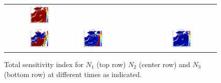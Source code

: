\begin{figure}[h]
\begin{tabular}{clc}
\hspace*{-65pt}
\includegraphics[width=0.45\textwidth]{./figures/T22d4.pdf} \\
\hspace*{-65pt}
\includegraphics[width=0.45\textwidth]{./figures/T32d1.pdf} &
\hspace*{-65pt}
\includegraphics[width=0.45\textwidth]{./figures/T32d3.pdf} &
\hspace*{-65pt}
\includegraphics[width=0.45\textwidth]{./figures/T32d4.pdf}
\end{tabular}
\caption{Total sensitivity index for $N_1$ (top row) $N_2$ (center row) and $N_3$ (bottom row)
 at different times as indicated.}
\end{figure}
         
        
  \clearpage   